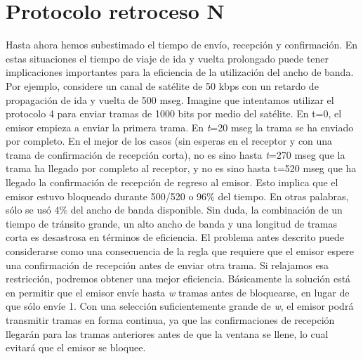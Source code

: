 \documentclass[
	12pt, %
	fleqn, %
	a4paper, %
]{LegrandOrangeBook}
\begin{document}
\section{Protocolo retroceso N}
Hasta ahora hemos subestimado el tiempo de envío, recepción y confirmación. En estas situaciones el tiempo de viaje de ida y vuelta prolongado puede tener implicaciones importantes para la eficiencia de la utilización del ancho de banda. Por ejemplo, considere un canal de satélite de 50 kbps con un retardo de propagación de ida y vuelta de 500 mseg. Imagine que intentamos utilizar el protocolo 4 para enviar tramas de 1000 bits por medio del satélite. En t=0, el emisor empieza a enviar la primera trama. En \textit{t}=20 mseg la trama se ha enviado por completo. En el mejor de los casos (sin esperas en el receptor y con una trama de confirmación de recepción corta), no es sino hasta \textit{t}=270 mseg que la trama ha llegado por completo al receptor, y no es sino hasta t=520 mseg que ha llegado la confirmación de recepción de regreso al emisor. Esto implica que el emisor estuvo bloqueado durante 500/520 o 96\% del tiempo. En otras palabras, sólo se usó 4\% del ancho de banda disponible. Sin duda, la combinación de un tiempo de tránsito grande, un alto ancho de banda y una longitud de tramas corta es desastrosa en términos de eficiencia. El problema antes descrito puede considerarse como una consecuencia de la regla que requiere que el emisor espere una confirmación de recepción antes de enviar otra trama. Si relajamos esa restricción, podremos obtener una mejor eficiencia. Básicamente la solución está en permitir que el emisor envíe hasta \textit{w} tramas antes de bloquearse, en lugar de que sólo envíe 1. Con una selección suficientemente grande de \textit{w}, el emisor podrá transmitir tramas en forma continua, ya que las confirmaciones de recepción llegarán para las tramas anteriores antes de que la ventana se llene, lo cual evitará que el emisor se bloquee.
\end{document}
